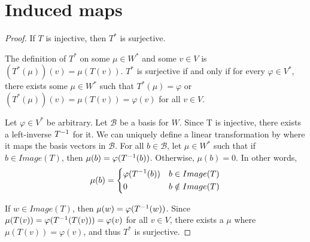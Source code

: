 \section{Induced maps}
\begin{proof} If $T$ is injective, then $T^*$ is surjective. \gap
    
    The definition of $T^*$ on some $\mu \in W^*$ 
    and some $v \in V$ is
    $(T^*(\mu))(v) = \mu(T(v))$.
    $T^*$ is surjective if and only if for every  $\varphi \in V^*$,
    there exists some $\mu \in W^*$ such that $T^*(\mu) = \varphi$ or
    $(T^*(\mu))(v) = \mu(T(v)) = \varphi(v)$
    for all $v \in V$. \gap

    
    Let $\varphi \in V^*$ be arbitrary. 
    Let $\mathcal{B}$ be a basis for $W$.
    Since T is injective, there exists a left-inverse $T^{-1}$ for it. 
    We can uniquely define a linear transformation by where it maps
    the basis vectors in $\mathcal{B}$. 
    For all $b \in \mathcal{B}$,
    let $\mu \in W^*$ such that
    if $b \in Image(T)$, then
    $\mu(b) = \varphi(T^{-1}(b))$.
    Otherwise,
    $\mu(b) = 0$.
    In other words,
    \[\mu(b) = 
    \begin{dcases}
        \varphi(T^{-1}(b)) & b \in Image(T)\\
        0 & b \notin Image(T)
    \end{dcases}
    \]\gap


    If $w \in Image(T)$, then
    $\mu(w) = \varphi(T^{-1}(w))$.
    Since
        $\mu(T(v))
        = \varphi(T^{-1}(T(v)))
        = \varphi(v)$
    for all $v \in V$, 
    there exists a $\mu$ where $\mu(T(v)) = \varphi(v)$,
    and thus $T^*$ is surjective.
\end{proof}\vspace{4mm}

